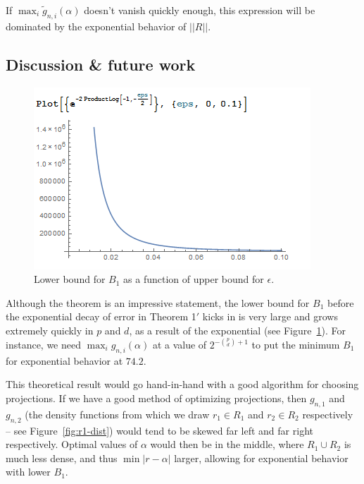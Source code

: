 \documentclass[ejs,preprint]{imsart}
\begin{document}
If $\max_i\tilde{g}_{n,i}(\alpha)$ doesn't vanish quickly enough, this
expression will be dominated by the exponential behavior of $||R||$.


\subsection{Discussion \& future work}

\begin{figure}
\begin{centering}
\includegraphics[scale=0.8]{aa-b1-as-func-of-eps.PNG}
\par\end{centering}

\caption{Lower bound for $B_{1}$ as a function of upper bound for $\epsilon$.}

\label{fig:b1-as-func-of-eps}
\end{figure}


Although the theorem is an impressive statement, the lower bound
for $B_{1}$ before the exponential decay of error in Theorem 1$'$ kicks
in is very large and grows extremely quickly in $p$ and $d$, as
a result of the exponential (see Figure~\ref{fig:b1-as-func-of-eps}).
For instance, we need $\max_i g_{n,i}(\alpha)$
at a value of $2^{-\binom{p}{d}+1}$ to put the minimum $B_{1}$ for
exponential behavior at $74.2$.

This theoretical result would go hand-in-hand with a good algorithm for choosing projections. If we have a good method of optimizing projections, then $g_{n,1}$ and $g_{n,2}$ (the density functions from which we draw $r_{1}\in R_{1}$ and $r_{2}\in R_{2}$ respectively -- see Figure~\ref{fig:r1-dist}) would tend to be skewed far left and far right respectively. Optimal values of $\alpha$ would then be in the middle, where $R_{1}\cup R_{2}$ is much less dense, and thus $\min|r-\alpha|$ larger, allowing for exponential behavior with lower $B_{1}$.
\end{document}
